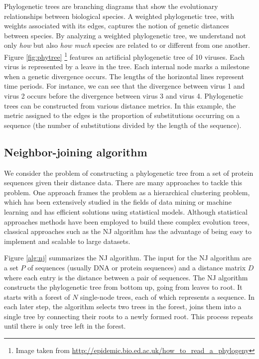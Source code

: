 \documentclass[11pt,letterpaper]{article}
\theoremstyle{definition}
\begin{document}
Phylogenetic trees are branching diagrams that show the evolutionary relationships between biological species. A weighted phylogenetic tree, with weights associated with its edges, captures the notion of genetic distances between species. By analyzing a weighted phylogenetic tree, we understand not only \textit{how} but also \textit{how much} species are related to or different from one another. Figure \ref{fig:phytree} \footnote{Image taken from \url{http://epidemic.bio.ed.ac.uk/how_to_read_a_phylogeny}} features an artificial phylogenetic tree of 10 viruses. Each virus is represented by a leave in the tree. Each internal node marks a milestone when a genetic divergence occurs. The lengths of the horizontal lines represent time periods. For instance, we can see that the divergence between virus 1 and virus 2 occurs before the divergence between virus 3 and virus 4. Phylogenetic trees can be constructed from various distance metrics. In this example, the metric assigned to the edges is the proportion of substitutions occurring on a sequence (the number of substitutions divided by the length of the sequence). 

\subsection{Neighbor-joining algorithm}

We consider the problem of constructing a phylogenetic tree from a set of protein sequences given their distance data. There are many approaches to tackle this problem. One approach frames the problem as a hierarchical clustering problem, which has been extensively studied in the fields of data mining or machine learning and has efficient solutions using statistical models. Although statistical approaches methods have been employed to build these complex evolution trees, classical approaches such as the NJ algorithm has the advantage of being easy to implement and scalable to large datasets. 

Figure \ref{alg:nj} summarizes the NJ algorithm. The input for the NJ algorithm are a set $P$ of sequences (usually DNA or protein sequences) and a distance matrix $D$ where each entry is the distance between a pair of sequences. The NJ algorithm constructs the phylogenetic tree from bottom up, going from leaves to root. It starts with a forest of $N$ single-node trees, each of which represents a sequence. In each later step, the algorithm selects two trees in the forest, joins them into a single tree by connecting their roots to a newly formed root. This process repeats until there is only tree left in the forest.
\end{document}
